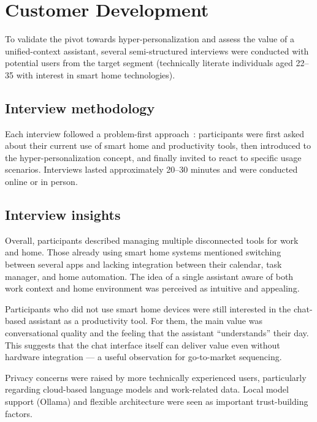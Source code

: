 \documentclass[a4paper,12pt]{article}
\begin{document}
\newpage

\section{Customer Development}
\label{sec:cd}

To validate the pivot towards hyper-personalization and assess the value of a unified-context assistant, several semi-structured interviews were conducted with potential users from the target segment (technically literate individuals aged 22--35 with interest in smart home technologies).

\subsection{Interview methodology}

Each interview followed a problem-first approach~\cite{blank}: participants were first asked about their current use of smart home and productivity tools, then introduced to the hyper-personalization concept, and finally invited to react to specific usage scenarios. Interviews lasted approximately 20--30 minutes and were conducted online or in person.

\subsection{Interview insights}

Overall, participants described managing multiple disconnected tools for work and home. Those already using smart home systems mentioned switching between several apps and lacking integration between their calendar, task manager, and home automation. The idea of a single assistant aware of both work context and home environment was perceived as intuitive and appealing.

Participants who did not use smart home devices were still interested in the chat-based assistant as a productivity tool. For them, the main value was conversational quality and the feeling that the assistant ``understands'' their day. This suggests that the chat interface itself can deliver value even without hardware integration --- a useful observation for go-to-market sequencing.

Privacy concerns were raised by more technically experienced users, particularly regarding cloud-based language models and work-related data. Local model support (Ollama) and flexible architecture were seen as important trust-building factors.
\end{document}
